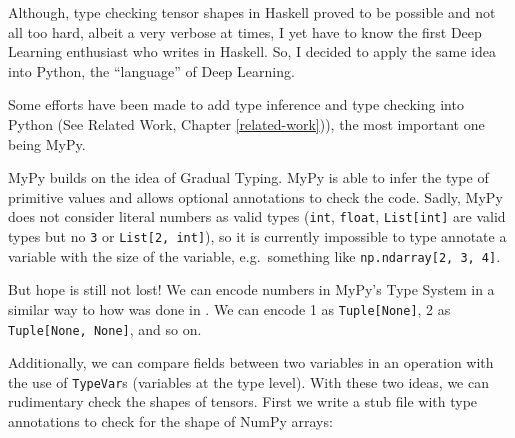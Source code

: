 Although, type checking tensor shapes in Haskell proved to be possible
and not all too hard, albeit a very verbose at times, I yet have to know
the first Deep Learning enthusiast who writes in Haskell. So, I decided
to apply the same idea into Python, the \enquote{language} of Deep
Learning.

Some efforts have been made to add type inference and type checking into
Python (See Related Work, Chapter \ref{related-work})), the most
important one being MyPy.

{}

MyPy builds on the idea of Gradual Typing. MyPy is able to infer the
type of primitive values and allows optional annotations to check the
code. Sadly, MyPy does not consider literal numbers as valid types
(\texttt{int}, \texttt{float}, \texttt{List{[}int{]}} are valid types
but no \texttt{3} or \texttt{List{[}2,\ int{]}}), so it is currently
impossible to type annotate a variable with the size of the variable,
e.g.~something like \texttt{np.ndarray{[}2,\ 3,\ 4{]}}.

But hope is still not lost! We can encode numbers in MyPy's Type System
in a similar way to how was done in
\autocites{chen_typesafe_2017}{eaton_statically_2006}. We can encode 1
as \texttt{Tuple{[}None{]}}, 2 as \texttt{Tuple{[}None,\ None{]}}, and
so on.

Additionally, we can compare fields between two variables in an
operation with the use of \texttt{TypeVar}s (variables at the type
level). With these two ideas, we can rudimentary check the shapes of
tensors. First we write a stub file \autocite{pep484} with type
annotations to check for the shape of NumPy arrays:


